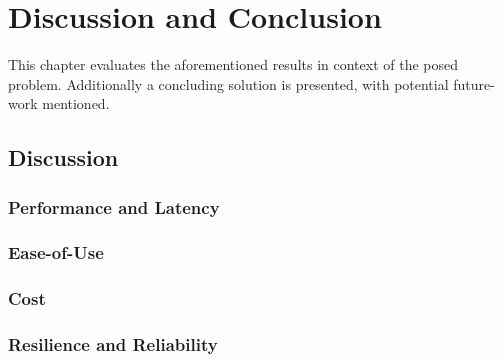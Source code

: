 \part{Discussion and Conclusion}

This chapter evaluates the aforementioned results in context of the posed problem.
Additionally a concluding solution is presented, with potential future-work mentioned.

\chapter{Discussion}

\section{Performance and Latency}
\section{Ease-of-Use}

\section{Cost}

\section{Resilience and Reliability}


